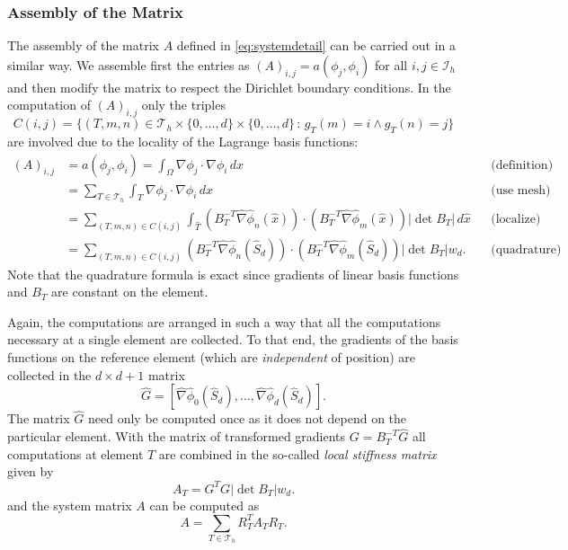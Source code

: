 \documentclass[a4paper,12pt]{article}
\begin{document}
\subsubsection*{Assembly of the Matrix}

The assembly of the matrix $A$ defined in \eqref{eq:systemdetail} can be carried
out in a similar way. We assemble first the entries as $(A)_{i,j}=a(\phi_j,\phi_i)$
for all $i,j\in\mathcal{I}_h$ and then modify the matrix to respect the Dirichlet
boundary conditions. In the computation of $(A)_{i,j}$ only the triples
$$C(i,j) = \{(T,m,n)\in\mathcal{T}_h\times\{0,\ldots,d\}\times\{0,\ldots,d\} \,:\, g_T(m)=i \wedge g_T(n)=j\}$$
are involved due to the locality of the Lagrange basis functions:
\begin{align*}
(A)_{i,j} &= a(\phi_j,\phi_i) = \int_\Omega \nabla \phi_j \cdot \nabla \phi_i \,dx 
&&\text{(definition)}\\
&= \sum_{T\in\mathcal{T}_h} \int_T \nabla \phi_j \cdot \nabla \phi_i \,dx
&&\text{(use mesh)}\\
&= \sum_{(T,m,n)\in C(i,j)}
\int_{\hat T} (B_T^{-T} \hat\nabla\hat\phi_n(\hat x))\cdot (B_T^{-T} \hat\nabla\hat\phi_m(\hat x))
|\det B_T| \,d\hat x &&\text{(localize)}\\
&= \sum_{(T,m,n)\in C(i,j)}
(B_T^{-T} \hat\nabla\hat\phi_n(\hat S_d))\cdot (B_T^{-T} \hat\nabla\hat\phi_m(\hat S_d))
|\det B_T| w_d . &&\text{(quadrature)}
\end{align*}
Note that the quadrature formula is exact since gradients of linear basis functions
and $B_T$ are constant on the element.

Again, the computations are arranged in such a way that all the computations
necessary at a single element are collected. To that end,
the gradients of the basis functions on the reference element (which are {\em independent}
of position) are collected in the $d\times d+1$ matrix
\begin{equation*}
\hat G = \left[\hat\nabla\hat\phi_0(\hat S_d),\ldots,\hat\nabla\hat\phi_d(\hat S_d)\right] .
\end{equation*}
The matrix $\hat G$ need only be computed once as it does not depend on the
particular element.
With the matrix of transformed gradients $G=B_T^{-T} \hat G$
all computations at element $T$ are 
combined in the so-called {\em local stiffness matrix} given by
\begin{equation}
A_T = G^T G |\det B_T| w_d .
\label{eq:jacobian_volume}
\end{equation}
and the system matrix $A$ can be computed as
\begin{equation}
A =  \sum_{T\in\mathcal{T}_h} R_T^T A_T R_T .
\label{eq:matrixassembly}
\end{equation}
\end{document}
